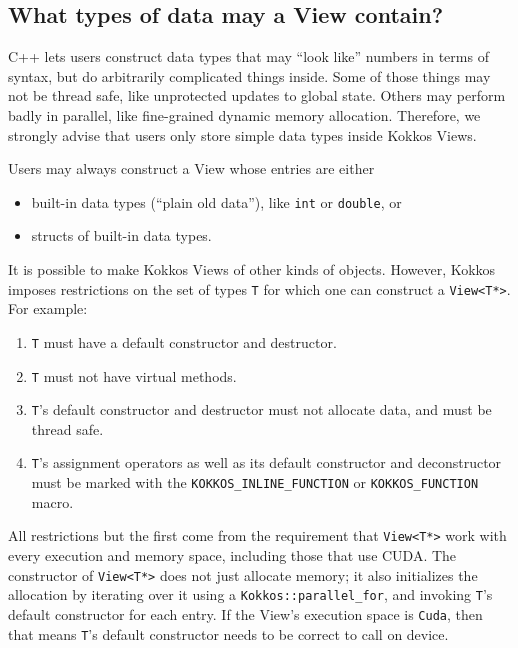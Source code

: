 \subsection{What types of data may a View contain?}
\label{SS:View:CreateUse:ValidValueType}

C++ lets users construct data types that may ``look like'' numbers in
terms of syntax, but do arbitrarily complicated things inside.  Some
of those things may not be thread safe, like unprotected updates to
global state.  Others may perform badly in parallel, like fine-grained
dynamic memory allocation.  Therefore, we strongly advise that users
only store simple data types inside Kokkos Views.

Users may always construct a View whose entries are either
\begin{itemize}
\item built-in data types (``plain old data''), like \texttt{int} or
  \texttt{double}, or
\item structs of built-in data types.
\end{itemize}

It is possible to make Kokkos Views of other kinds of objects.
However, Kokkos imposes restrictions on the set of types \lstinline|T|
for which one can construct a \lstinline|View<T*>|.  For example:
\begin{enumerate}
\item \lstinline|T| must have a default constructor and destructor. 
\item \lstinline|T| must not have virtual methods.
\item \lstinline|T|'s default constructor and destructor must not
  allocate data, and must be thread safe.
\item \lstinline|T|'s assignment operators as well as its default
  constructor and deconstructor must be marked with the
  \lstinline|KOKKOS_INLINE_FUNCTION| or \lstinline|KOKKOS_FUNCTION|
  macro.
\end{enumerate}

All restrictions but the first come from the requirement that
\lstinline|View<T*>| work with every execution and memory space,
including those that use CUDA.  The constructor of
\lstinline|View<T*>| does not just allocate memory; it also
initializes the allocation by iterating over it using a
\lstinline|Kokkos::parallel_for|, and invoking \lstinline|T|'s default
constructor for each entry.  If the View's execution space is
\lstinline|Cuda|, then that means \lstinline|T|'s default constructor
needs to be correct to call on device.


